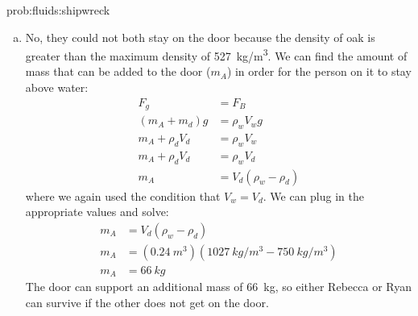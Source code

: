 {{\begin{solution}{prob:fluids:shipwreck}
\begin{enumerate}[(a)]
\begin{align*}
\rho_d&=\frac{\rho_wV_d-m_R-m_r}{V_d}\\
\rho_d&=\frac{(\SI{1027}{kg/m^3})(\SI{0.24}{m^3})-\SI{57}{kg}-\SI{63}{kg}}{\SI{0.24}{m^3}}\\
\rho_d&=\SI{527}{kg/m^3}
\end{align*}
The maximum density of the wood that would allow them to both float is \SI{527}{kg/m^3}. Balsa wood has a density that is about $\SI{150}{kg/m^3}$, so would allow them to survive. However, it is unlikely that a random floating door is made of balsa wood (although one would choose lighter materials when constructing a ship).
\item No, they could not both stay on the door because the density of oak is greater than the maximum density of \SI{527}{kg/m^3}. We can find the amount of mass that can be added to the door ($m_A$) in order for the person on it to stay above water:
\begin{align*}
F_g&=F_B\\
(m_A+m_d)g&=\rho_wV_wg\\
m_A+\rho_dV_d&=\rho_wV_w\\
m_A+\rho_dV_d&=\rho_wV_d\\
m_A&=V_d(\rho_w-\rho_d)
\end{align*}
where we again used the condition that $V_w=V_d$. We can plug in the appropriate values and solve:
\begin{align*}
m_A&=V_d(\rho_w-\rho_d)\\
m_A&=(\SI{0.24}{m^3})(\SI{1027}{kg/m^3}-\SI{750}{kg/m^3})\\
m_A&=\SI{66}{kg}
\end{align*}
The door can support an additional mass of \SI{66}{kg}, so either Rebecca or Ryan can survive if the other does not get on the door.  
\end{enumerate}
\end{solution}

}}
